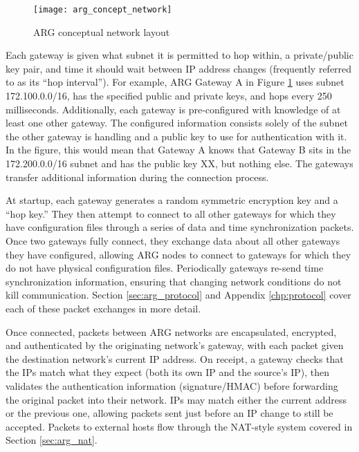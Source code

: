 \begin{figure}
	\centering
	\texttt{[image: arg\_concept\_network]}
	\caption{\ac{ARG} conceptual network layout}
	\label{fig:arg_concept_network}
\end{figure}

\par Each gateway is given what subnet it is permitted to hop within, a private/public key pair, and time it should wait between \ac{IP} address changes (frequently referred to as its ``hop interval''). For example, \ac{ARG} Gateway A in Figure \ref{fig:arg_concept_network} uses subnet 172.100.0.0/16, has the specified public and private keys, and hops every 250 milliseconds. Additionally, each gateway is pre-configured with knowledge of at least one other gateway. The configured information consists solely of the subnet the other gateway is handling and a public key to use for authentication with it. In the figure, this would mean that Gateway A knows that Gateway B sits in the 172.200.0.0/16 subnet and has the public key XX, but nothing else. The gateways transfer additional information during the connection process. 

\par At startup, each gateway generates a random symmetric encryption key and a ``hop key.'' They then attempt to connect to all other gateways for which they have configuration files through a series of data and time synchronization packets. Once two gateways fully connect, they exchange data about all other gateways they have configured, allowing \ac{ARG} nodes to connect to gateways for which they do not have physical configuration files. Periodically gateways re-send time synchronization information, ensuring that changing network conditions do not kill communication. Section \ref{sec:arg_protocol} and Appendix \ref{chp:protocol} cover each of these packet exchanges in more detail.

\par Once connected, packets between ARG networks are encapsulated, encrypted, and authenticated by the originating network's gateway, with each packet given the destination network's current \ac{IP} address. On receipt, a gateway checks that the \acp{IP} match what they expect (both its own IP and the source's IP), then validates the authentication information (signature/\ac{HMAC}) before forwarding the original packet into their network. \acp{IP} may match either the current address or the previous one, allowing packets sent just before an \ac{IP} change to still be accepted. Packets to external hosts flow through the \ac{NAT}-style system covered in Section \ref{sec:arg_nat}. 

